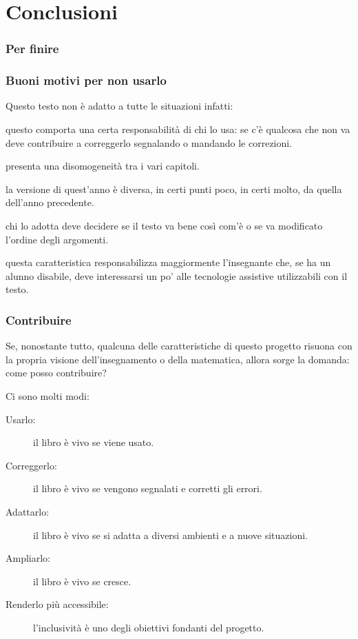 \documentclass{beamer} %
\begin{document}
\section{Conclusioni}

\begin{frame}\frametitle{Per finire}

\begin{center}  \end{center}

\end{frame}


\begin{frame}\frametitle{Buoni motivi per non usarlo}

Questo testo non è adatto a tutte le situazioni infatti:
\pause
\begin{description} [<+->]
\item [È libero:~~~~ ] questo comporta una certa responsabilità di chi 
lo usa:
se c'è qualcosa che non va deve contribuire a correggerlo segnalando o 
mandando le correzioni.
\item [È collaborativo: ] presenta una disomogeneità tra i vari capitoli.
\item [È evolutivo: ] la versione di quest'anno è diversa, in certi punti 
poco, in certi molto, da quella dell'anno precedente.
\item [È polimorfo: ] chi lo adotta deve decidere se il testo va bene così 
com'è o se va modificato l'ordine degli argomenti.
\item [È accessibile: ] questa caratteristica responsabilizza maggiormente 
l'insegnante che, se ha un alunno disabile, deve interessarsi un po' alle 
tecnologie assistive utilizzabili con il testo.
\end{description}

\end{frame}


\begin{frame}\frametitle{Contribuire}

Se, nonostante tutto, qualcuna delle caratteristiche di questo progetto 
risuona con la propria visione dell'insegnamento o della matematica, allora 
sorge la domanda: come posso contribuire?

\vspace{1em}
Ci sono molti modi:
\spause
\begin{description}
\item [Usarlo:\hspace{10.3mm}] il libro è vivo se viene usato.
\item [Correggerlo: ] il libro è vivo se vengono segnalati e corretti gli 
errori.
\item [Adattarlo:\hspace{4mm} ] il libro è vivo se si adatta a diversi 
ambienti e a nuove situazioni.
\item [Ampliarlo:\hspace{3mm} ] il libro è vivo se cresce.
\item [Renderlo più accessibile: ] l'inclusività è uno degli obiettivi 
fondanti del progetto.
\end{description}

\end{frame}
\end{document}
